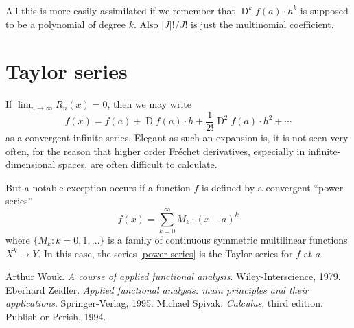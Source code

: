 \documentclass[12pt]{article}
\providecommand{\abs}[1]{\lvert#1\rvert}
\DeclareMathOperator{\D}{D}
\begin{document}
All this is more easily assimilated if we remember that
$\D^k f(a) \cdot h^k$ is supposed to be a polynomial of degree $k$.
Also $\abs{J}!/J!$ is just the multinomial coefficient.

\section*{Taylor series}
If $\lim_{n \to \infty} R_n(x) = 0$,
then we may write
\begin{equation}\label{taylor}
f(x) = f(a) + \D f(a) \cdot h + \frac{1}{2!} \D^2 f(a) \cdot h^2 + \dotsb
\end{equation}
as a convergent infinite series. Elegant as such an expansion is,
it is not seen very often,
for the reason that higher order Fr\'echet derivatives, especially in infinite-dimensional spaces,
are often difficult to calculate.

But a notable exception occurs if a function $f$ is defined by a convergent ``power series''
\begin{equation}\label{power-series}
f(x) = \sum_{k=0}^\infty M_k \cdot (x-a)^k
\end{equation}
where $\{ M_k : k = 0, 1, \dotsc \}$ is a family of continuous symmetric multilinear functions $X^k \to Y$.
In this case, the series \eqref{power-series} is the Taylor series for $f$ at $a$.

\begin{thebibliography}{3}
Arthur Wouk. {\it A course of applied functional analysis}. Wiley-Interscience, 1979.
Eberhard Zeidler. {\it Applied functional analysis: main principles and their applications}. Springer-Verlag, 1995.
Michael Spivak. {\it Calculus}, third edition. Publish or Perish, 1994.
\end{thebibliography}
\end{document}
